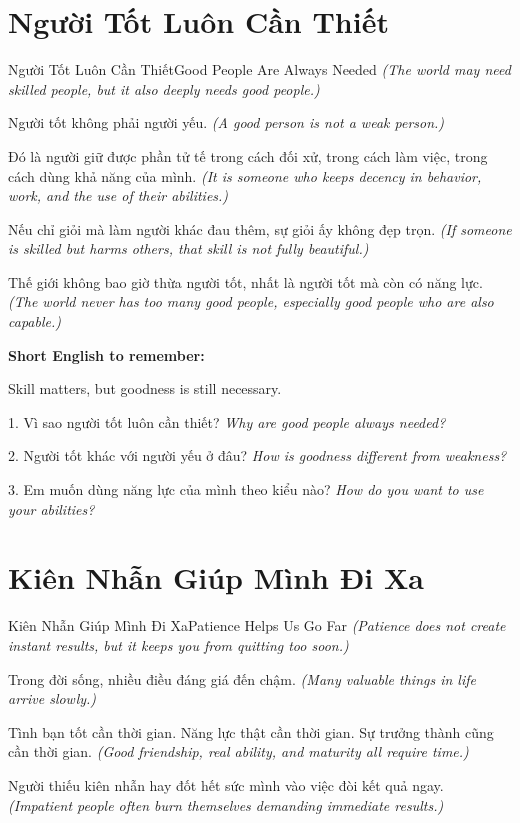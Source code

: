 \section{Người Tốt Luôn Cần Thiết}
\begin{truyen}{Người Tốt Luôn Cần Thiết}{Good People Are Always Needed}
\textit{(The world may need skilled people, but it also deeply needs good people.)}

Người tốt không phải người yếu.
\textit{(A good person is not a weak person.)}

Đó là người giữ được phần tử tế trong cách đối xử, trong cách làm việc, trong cách dùng khả năng của mình.
\textit{(It is someone who keeps decency in behavior, work, and the use of their abilities.)}

Nếu chỉ giỏi mà làm người khác đau thêm, sự giỏi ấy không đẹp trọn.
\textit{(If someone is skilled but harms others, that skill is not fully beautiful.)}
\end{truyen}

\begin{baihoc}
Thế giới không bao giờ thừa người tốt, nhất là người tốt mà còn có năng lực.
\textit{(The world never has too many good people, especially good people who are also capable.)}
\end{baihoc}

\begin{ghinhoanh}
\textbf{Short English to remember:}

Skill matters, but goodness is still necessary.

\end{ghinhoanh}

\begin{tuhocnhanh}
1. Vì sao người tốt luôn cần thiết? \textit{Why are good people always needed?}

2. Người tốt khác với người yếu ở đâu? \textit{How is goodness different from weakness?}

3. Em muốn dùng năng lực của mình theo kiểu nào? \textit{How do you want to use your abilities?}
\end{tuhocnhanh}
\ngancach

\section{Kiên Nhẫn Giúp Mình Đi Xa}
\begin{truyen}{Kiên Nhẫn Giúp Mình Đi Xa}{Patience Helps Us Go Far}
\textit{(Patience does not create instant results, but it keeps you from quitting too soon.)}

Trong đời sống, nhiều điều đáng giá đến chậm.
\textit{(Many valuable things in life arrive slowly.)}

Tình bạn tốt cần thời gian. Năng lực thật cần thời gian. Sự trưởng thành cũng cần thời gian.
\textit{(Good friendship, real ability, and maturity all require time.)}

Người thiếu kiên nhẫn hay đốt hết sức mình vào việc đòi kết quả ngay.
\textit{(Impatient people often burn themselves demanding immediate results.)}
\end{truyen}

